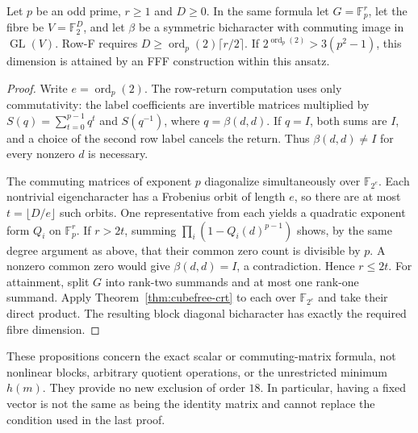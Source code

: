 \begin{proposition}
\label{prop:matrix-boundary}
Let $p$ be an odd prime, $r\geq1$ and $D\geq0$.
In the same formula let $G=\mathbb F_p^r$, let the fibre be
$V=\mathbb F_2^D$, and let $\beta$ be a symmetric bicharacter with
commuting image in $\operatorname{GL}(V)$. Row-F requires
$D\geq\operatorname{ord}_p(2)\lceil r/2\rceil$.
If $2^{\operatorname{ord}_p(2)}>3(p^2-1)$, this dimension is attained
by an FFF construction within this ansatz.
\end{proposition}

\begin{proof}
Write $e=\operatorname{ord}_p(2)$. The row-return computation uses only
commutativity: the label coefficients are invertible matrices multiplied
by $S(q)=\sum_{t=0}^{p-1}q^t$ and $S(q^{-1})$, where $q=\beta(d,d)$.
If $q=I$, both sums are $I$, and a choice of the second row label cancels
the return. Thus $\beta(d,d)\ne I$ for every nonzero $d$ is necessary.

The commuting matrices of exponent $p$ diagonalize simultaneously over
$\mathbb F_{2^e}$. Each nontrivial eigencharacter has a Frobenius orbit
of length $e$, so there are at most $t=\lfloor D/e\rfloor$ such orbits.
One representative from each yields a quadratic exponent form $Q_i$ on
$\mathbb F_p^r$. If $r>2t$, summing
$\prod_i(1-Q_i(d)^{p-1})$ shows, by the same degree argument as above,
that their common zero count is divisible by $p$. A nonzero common
zero would give $\beta(d,d)=I$, a contradiction. Hence $r\leq2t$.
For attainment, split $G$ into rank-two summands and at most one rank-one
summand. Apply Theorem~\ref{thm:cubefree-crt} to each over
$\mathbb F_{2^e}$ and take their direct product. The resulting block
diagonal bicharacter has exactly the required fibre dimension.
\end{proof}

These propositions concern the exact scalar or commuting-matrix
formula, not nonlinear blocks, arbitrary quotient operations, or the
unrestricted minimum $h(m)$. They provide no new exclusion of order $18$.
In particular, having a fixed vector is not the same as being the identity
matrix and cannot replace the condition used in the last proof.
